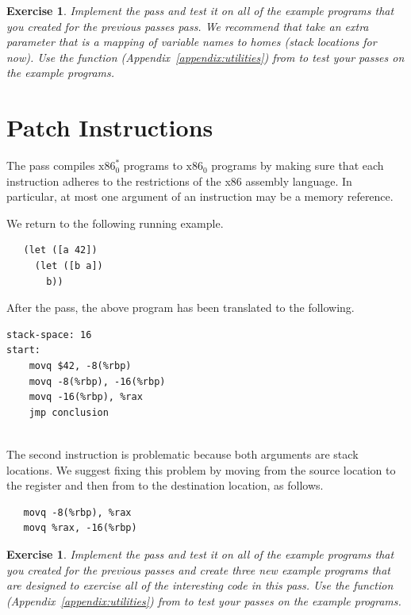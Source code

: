 \documentclass[11pt]{book}
\newtheorem{exercise}[theorem]{Exercise}
\begin{document}
\begin{exercise}
\normalfont Implement the  pass and test it on all
of the example programs that you created for the previous passes pass.
We recommend that  take an extra parameter that is a
mapping of variable names to homes (stack locations for now).  Use the
 function (Appendix~\ref{appendix:utilities}) from
 to test your passes on the example programs.
\end{exercise}


\section{Patch Instructions}
\label{sec:patch-s0}

The  pass compiles $\text{x86}^{*}_0$
programs to $\text{x86}_0$ programs by making sure that each
instruction adheres to the restrictions of the x86 assembly language.
In particular, at most one argument of an instruction may be a memory
reference.

We return to the following running example.
\begin{lstlisting}
   (let ([a 42])
     (let ([b a])
       b))
\end{lstlisting}
After the  pass, the above program has been translated to
the following. \\
\begin{minipage}{0.5\textwidth}
\begin{lstlisting}
stack-space: 16
start:
    movq $42, -8(%rbp)
    movq -8(%rbp), -16(%rbp)
    movq -16(%rbp), %rax
    jmp conclusion
\end{lstlisting}
\end{minipage}\\
The second  instruction is problematic because both
arguments are stack locations. We suggest fixing this problem by
moving from the source location to the register  and then
from  to the destination location, as follows.
\begin{lstlisting}
   movq -8(%rbp), %rax
   movq %rax, -16(%rbp)
\end{lstlisting}

\begin{exercise}
\normalfont
Implement the  pass and test it on all of the
example programs that you created for the previous passes and create
three new example programs that are designed to exercise all of the
interesting code in this pass. Use the  function
(Appendix~\ref{appendix:utilities}) from  to test
your passes on the example programs.
\end{exercise}
\end{document}
